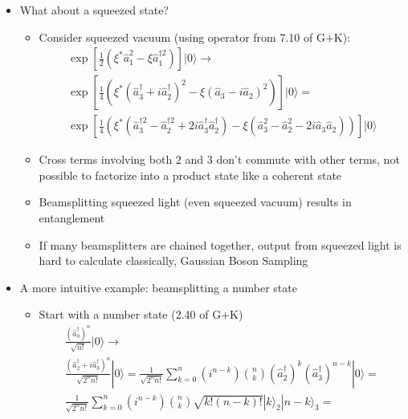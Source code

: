 \documentclass[english]{article}
\newcommand{\ket}[1]{|#1 \rangle}
\begin{document}
\begin{itemize}
\begin{itemize}
\begin{align}
\end{align}
\item Note that this relies on the fact that operators corresponding to different modes commute
\item Agrees with classical electromagnetic wave expectations $\rightarrow$ there is nothing that coherent states+ beamsplitters can give us which cannot be predicted from classical electromagnatism
\end{itemize}
\item What about a squeezed state?
\begin{itemize}
\item Consider squeezed vacuum (using operator from 7.10 of G+K): 
\begin{align}
\exp\left[\frac{1}{2}(\xi^*\hat{a}_1^2-\xi \hat{a}_1^{\dagger 2})\right]\ket{0} \rightarrow \\
\exp\left[\frac{1}{4}(\xi^*(\hat{a}^{\dagger}_3+i\hat{a}^{\dagger}_2)^2-\xi (\hat{a}_3-i\hat{a}_2)^2)\right]\ket{0}=\\
\exp\left[\frac{1}{4}(\xi^*(\hat{a}^{\dagger 2}_3-\hat{a}^{\dagger 2}_2+2i\hat{a}^{\dagger}_3\hat{a}^{\dagger}_2)-\xi (\hat{a}^2_3-\hat{a}^2_2-2i\hat{a}_3\hat{a}_2))\right]\ket{0}
\end{align}
\item Cross terms involving both $2$ and $3$ don't commute with other terms, not possible to factorize into a product state like a coherent state
\item Beamsplitting squeezed light (even squeezed vacuum) results in entanglement
\item If many beamsplitters are chained together, output from squeezed light is hard to calculate classically, Gaussian Boson Sampling
\end{itemize}
\item A more intuitive example: beamsplitting a number state
\begin{itemize}
\item Start with a number state (2.40 of G+K) 
\begin{align}
 \frac{(\hat{a}_0^\dagger)^n}{\sqrt{n!}}\ket{0} \rightarrow \\
  \frac{(\hat{a}_2^\dagger+i\hat{a}_3^\dagger)^n}{\sqrt{2^n n!}}\ket{0}=\frac{1}{\sqrt{2^n n!}}\sum_{k=0}^n (i^{n-k})\binom{n}{k}(\hat{a}_2^\dagger)^k(\hat{a}_3^\dagger)^{n-k}\ket{0}=\\
  \frac{1}{\sqrt{2^n n!}}\sum_{k=0}^n (i^{n-k})\binom{n}{k} \sqrt{k!(n-k)!}\ket{k}_2\ket{n-k}_3=  \\

\end{align}
\end{itemize}
\end{itemize}
\end{document}
